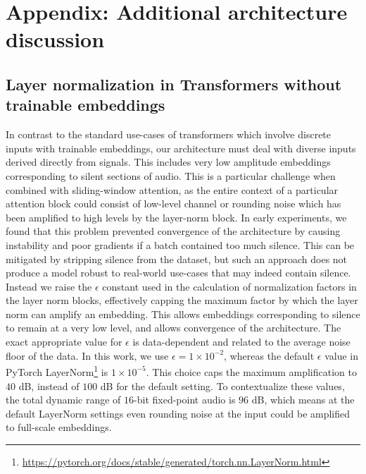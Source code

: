 \documentclass{article} %
\begin{document}
\section{Appendix: Additional architecture discussion}

\subsection{Layer normalization in Transformers without trainable embeddings}
\label{app:epsilon}

In contrast to the standard use-cases of transformers which involve discrete inputs with trainable embeddings, our architecture must deal with diverse inputs derived directly from signals. This includes very low amplitude embeddings corresponding to silent sections of audio. This is a particular challenge when combined with sliding-window attention, as the entire context of a particular attention block could consist of low-level channel or rounding noise which has been amplified to high levels by the layer-norm block. In early experiments, we found that this problem prevented convergence of the architecture by causing instability and poor gradients if a batch contained too much silence. This can be mitigated by stripping silence from the dataset, but such an approach does not produce a model robust to real-world use-cases that may indeed contain silence. Instead we raise the $\epsilon$ constant used in the calculation of normalization factors in the layer norm blocks, effectively capping the maximum factor by which the layer norm can amplify an embedding. This allows embeddings corresponding to silence to remain at a very low level, and allows convergence of the architecture. The exact appropriate value for $\epsilon$ is data-dependent and related to the average noise floor of the data. In this work, we use $\epsilon = 1 \times 10^{-2}$, whereas the default $\epsilon$ value in PyTorch LayerNorm\footnote{\url{https://pytorch.org/docs/stable/generated/torch.nn.LayerNorm.html}} is $1 \times 10^{-5}$. This choice caps the maximum amplification to $40$ dB, instead of $100$ dB for the default setting. To contextualize these values, the total dynamic range of $16$-bit fixed-point audio is $96$ dB, which means at the default LayerNorm settings even rounding noise at the input could be amplified to full-scale embeddings.
\end{document}
